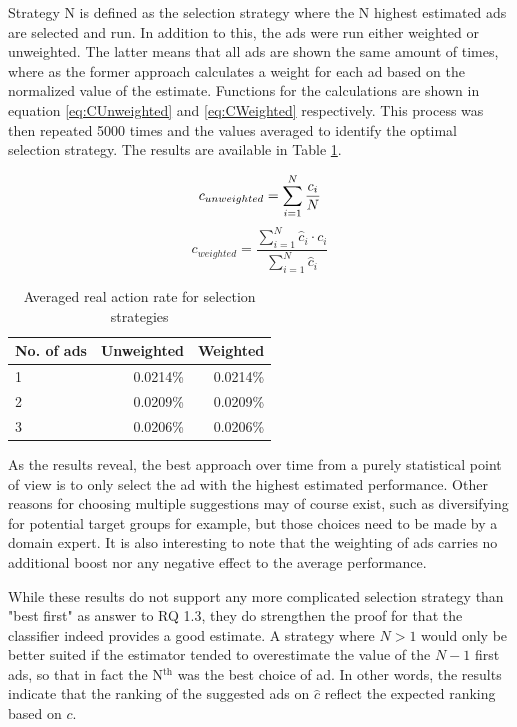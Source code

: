 \documentclass{sig-alternate}
\newcommand{\superscript}[1]{\ensuremath{^{\textrm{#1}}}}
\begin{document}
Strategy N is defined as the selection strategy where the N highest estimated ads are selected and run. In addition to this, the ads were run either weighted or unweighted. The latter means that all ads are shown the same amount of times, where as the former approach calculates a weight for each ad based on the normalized value of the estimate. Functions for the calculations are shown in equation \ref{eq:CUnweighted} and \ref{eq:CWeighted} respectively. This process was then repeated 5000 times and the values averaged to identify the optimal selection strategy. The results are available in Table \ref{tbl:SelectionStrategy}.

\begin{equation}
	c_{unweighted} = \sum_{i=1}^{N} \frac{ c_i }{ N } \\
	\label{eq:CUnweighted}
\end{equation}
\begin{equation}
	c_{weighted} = \frac{ \sum_{i=1}^{N} \hat{c}_i \cdot c_i }{ \sum_{i=1}^{N} \hat{c}_i }
	\label{eq:CWeighted}
\end{equation}

\begin{table}
\begin{center}
	\begin{tabular}{  l | r  r  }
		\hline
		\textbf{No. of ads} & \textbf{Unweighted} & \textbf{Weighted} \\
		\hline
		1 & 0.0214\% & 0.0214\% \\
		2 & 0.0209\% & 0.0209\% \\
		3 & 0.0206\% & 0.0206\% \\
		\hline
	\end{tabular}
	\caption{Averaged real action rate for selection strategies}
	\label{tbl:SelectionStrategy}
\end{center}
\end{table}

As the results reveal, the best approach over time from a purely statistical point of view is to only select the ad with the highest estimated performance. Other reasons for choosing multiple suggestions may of course exist, such as diversifying for potential target groups for example, but those choices need to be made by a domain expert. It is also interesting to note that the weighting of ads carries no additional boost nor any negative effect to the average performance.

While these results do not support any more complicated selection strategy than "best first" as answer to RQ 1.3, they do strengthen the proof for that the classifier indeed provides a good estimate. A strategy where \(N > 1\) would only be better suited if the estimator tended to overestimate the value of the \(N-1\) first ads, so that in fact the N\superscript{th} was the best choice of ad. In other words, the results indicate that the ranking of the suggested ads on \(\hat{c}\) reflect the expected ranking based on \(c\).
\end{document}
